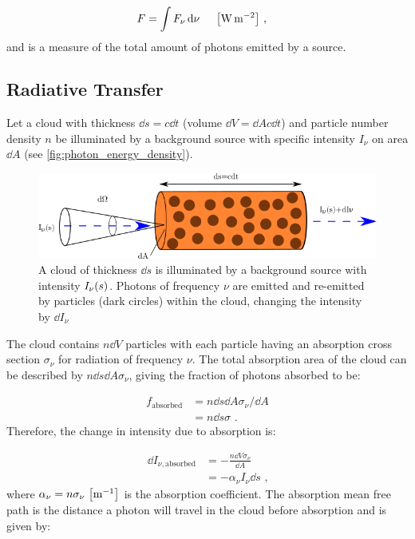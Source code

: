 \begin{equation}
	\begin{aligned}
		F&=\int F_\nu \dd{\nu}~\quad\qty[\si{\watt\per\meter\squared}]\text{ ,}
	\end{aligned}
\end{equation}
\noindent and is a measure of the total amount of photons emitted by a source.

\subsection{Radiative Transfer}

Let a cloud with thickness $\dd{s}=c\dd{t}$ (volume $\dd{V}=\dd{A}c\dd{t}$) and particle number density $n$ be illuminated by a background source with specific intensity $I_\nu$ on area $\dd{A}$ (see \autoref{fig:photon_energy_density}).

\begin{figure}[H]
	\centering
	\includegraphics[width=\textwidth]{06_Interstellar_Medium/Images/Theory/radiative_transfer.png}
	\caption{A cloud of thickness $\dd{s}$ is illuminated by a background source with intensity $I_\nu\qty(s)$. Photons of frequency $\nu$ are emitted and re-emitted by particles (dark circles) within the cloud, changing the intensity by $\dd{I_\nu}$}
	\label{fig:photon_energy_density}
\end{figure}
\noindent The cloud contains $n\dd{V}$ particles with each particle having an absorption cross section $\sigma_\nu$ for radiation of frequency $\nu$. The total absorption area of the cloud can be described by $n\dd{s}\dd{A}\sigma_\nu$, giving the fraction of photons absorbed to be:

\begin{equation}
    \begin{aligned}
        f_\text{absorbed}&=n\dd{s}\dd{A}\sigma_\nu/\dd{A} \\
        &=n\dd{s}\sigma \text{ .}
    \end{aligned}
\end{equation}
\noindent Therefore, the change in intensity due to absorption is:

\begin{equation}
    \begin{aligned}
        \dd{I_{\nu,\text{absorbed}}}&=- \frac{n\dd{V}\sigma_\nu}{\dd{A}} \\
        &= - \alpha_\nu I_\nu \dd{s}\text{ ,}
    \end{aligned}
\end{equation}
\noindent where $\alpha_\nu=n\sigma_\nu~\qty[\si{\per\meter}]$ is the absorption coefficient. The absorption mean free path is the distance a photon will travel in the cloud before absorption and is given by:


